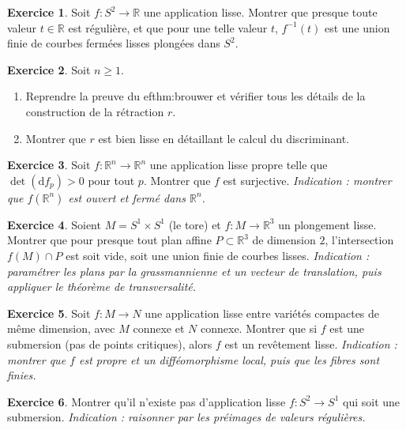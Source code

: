 \documentclass[12pt,a4paper,openany]{book}
\theoremstyle{definition}
\newtheorem{exercice}{Exercice}[chapter]
\theoremstyle{plain}
\theoremstyle{remark}
\newcommand{\R}{\mathbb{R}}
\newcommand{\dd}{\mathrm{d}}
\begin{document}
\begin{exercice}\label{exo:sard-4}
Soit $f \colon S^2 \to \R$ une application lisse. Montrer que presque toute
valeur $t \in \R$ est régulière, et que pour une telle valeur $t$,
$f^{-1}(t)$ est une union finie de courbes fermées lisses plongées dans $S^2$.
\end{exercice}

\begin{exercice}\label{exo:sard-5}
Soit $n \geq 1$.
\begin{enumerate}[label=(\alph*)]
  \item Reprendre la preuve du 
ef{thm:brouwer} et vérifier tous les
  détails de la construction de la rétraction $r$.
  \item Montrer que $r$ est bien lisse en détaillant le calcul du discriminant.
\end{enumerate}
\end{exercice}

\begin{exercice}\label{exo:sard-6}
Soit $f \colon \R^n \to \R^n$ une application lisse propre telle que
$\det(\dd f_p) > 0$ pour tout $p$. Montrer que $f$ est surjective.
\textit{Indication : montrer que $f(\R^n)$ est ouvert et fermé dans $\R^n$.}
\end{exercice}

\begin{exercice}\label{exo:sard-7}
Soient $M = S^1 \times S^1$ (le tore) et $f \colon M \to \R^3$ un plongement
lisse. Montrer que pour presque tout plan affine $P \subset \R^3$ de dimension
$2$, l'intersection $f(M) \cap P$ est soit vide, soit une union finie de courbes
lisses.
\textit{Indication : paramétrer les plans par la grassmannienne et un vecteur
de translation, puis appliquer le théorème de transversalité.}
\end{exercice}

\begin{exercice}\label{exo:sard-8}
Soit $f \colon M \to N$ une application lisse entre variétés compactes de même
dimension, avec $M$ connexe et $N$ connexe. Montrer que si $f$ est une
submersion (pas de points critiques), alors $f$ est un revêtement lisse.
\textit{Indication : montrer que $f$ est propre et un difféomorphisme local, puis
que les fibres sont finies.}
\end{exercice}

\begin{exercice}\label{exo:sard-9}
Montrer qu'il n'existe pas d'application lisse $f \colon S^2 \to S^1$ qui
soit une submersion.
\textit{Indication : raisonner par les préimages de valeurs régulières.}
\end{exercice}
\end{document}
